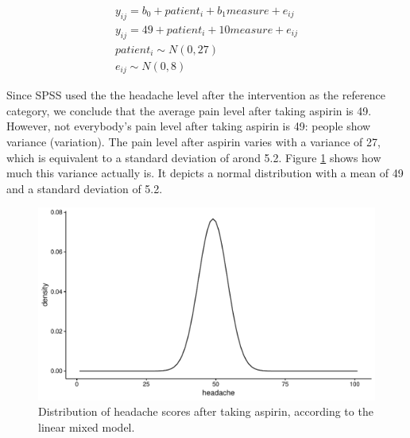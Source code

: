 \documentclass[]{book}\usepackage[]{graphicx}\usepackage[]{color}
\makeatletter
\def\maxwidth{ %
  \ifdim\Gin@nat@width>\linewidth
    \linewidth
  \else
    \Gin@nat@width
  \fi
}
\newenvironment{knitrout}{}{} %
\makeatother
\begin{document}
\begin{eqnarray}
y_{ij} = b_0 + patient_i + b_1 measure + e_{ij} \\
y_{ij} = 49 + patient_i + 10 measure + e_{ij} \\
patient_i \sim N(0, 27)\\
e_{ij} \sim N(0, 8)
\end{eqnarray}

Since SPSS used the the headache level after the intervention as the reference category, we conclude that the average pain level after taking aspirin is 49. However, not everybody's pain level after taking aspirin is 49: people show variance (variation). The pain level after aspirin varies with a variance of 27, which is equivalent to a standard deviation of arond 5.2. Figure \ref{fig:resultsprepost1} shows how much this variance actually is. It depicts a normal distribution with a mean of 49 and a standard deviation of 5.2.


\begin{knitrout}
\color{fgcolor}\begin{figure}

{\centering \includegraphics[width=\maxwidth]{figure/resultsprepost1-1} 

}

\caption[Distribution of headache scores after taking aspirin, according to the linear mixed model]{Distribution of headache scores after taking aspirin, according to the linear mixed model.}\label{fig:resultsprepost1}
\end{figure}


\end{knitrout}
\end{document}
